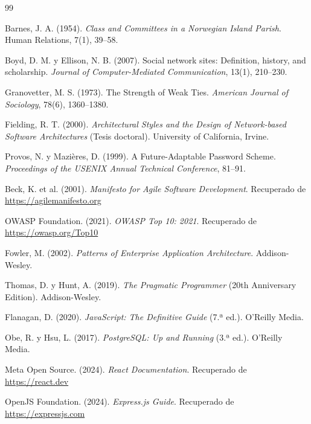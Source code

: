 \documentclass[a4paper]{report}
\begin{document}
\newpage

\begin{thebibliography}{99}

Barnes, J. A. (1954). \textit{Class and Committees in a Norwegian Island Parish}. Human Relations, 7(1), 39--58.

Boyd, D. M. y Ellison, N. B. (2007). Social network sites: Definition, history, and scholarship. \textit{Journal of Computer-Mediated Communication}, 13(1), 210--230.

Granovetter, M. S. (1973). The Strength of Weak Ties. \textit{American Journal of Sociology}, 78(6), 1360--1380.

Fielding, R. T. (2000). \textit{Architectural Styles and the Design of Network-based Software Architectures} (Tesis doctoral). University of California, Irvine.

Provos, N. y Mazières, D. (1999). A Future-Adaptable Password Scheme. \textit{Proceedings of the USENIX Annual Technical Conference}, 81--91.

Beck, K. et al. (2001). \textit{Manifesto for Agile Software Development}. Recuperado de \url{https://agilemanifesto.org}

OWASP Foundation. (2021). \textit{OWASP Top 10: 2021}. Recuperado de \url{https://owasp.org/Top10}

Fowler, M. (2002). \textit{Patterns of Enterprise Application Architecture}. Addison-Wesley.

Thomas, D. y Hunt, A. (2019). \textit{The Pragmatic Programmer} (20th Anniversary Edition). Addison-Wesley.

Flanagan, D. (2020). \textit{JavaScript: The Definitive Guide} (7.ª ed.). O'Reilly Media.

Obe, R. y Hsu, L. (2017). \textit{PostgreSQL: Up and Running} (3.ª ed.). O'Reilly Media.

Meta Open Source. (2024). \textit{React Documentation}. Recuperado de \url{https://react.dev}

OpenJS Foundation. (2024). \textit{Express.js Guide}. Recuperado de \url{https://expressjs.com}


\end{thebibliography}
\end{document}

